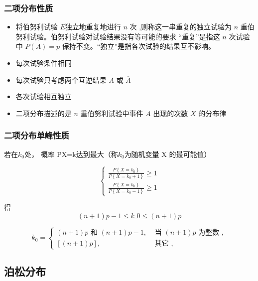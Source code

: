 \subsubsection{二项分布性质}

\begin{itemize}
    \item 将伯努利试验 $E$独立地重复地进行 $n$ 次 ,则称这一串重复的独立试验为 $n$ 重伯努利试验。伯努利试验对试验结果没有等可能的要求 “重复”是指这 $n$ 次试验中 $P(A)= p$ 保持不变。“独立”是指各次试验的结果互不影响。
    \item 每次试验条件相同
    \item 每次试验只考虑两个互逆结果 $A$ 或 $\overline{A}$
    \item 各次试验相互独立
    \item 二项分布描述的是 $n$ 重伯努利试验中事件 $A$ 出现的次数 $X$ 的分布律
\end{itemize}

\subsubsection{二项分布单峰性质}

若在$k_0$处， 概率 P{X=k}达到最大（称$k_0$为随机变量 X 的最可能值）

\begin{equation}
\left\{\begin{array}{l}
\frac{P\left\{X=k_{0}\right\}}{P\left\{X=k_{0}+1\right\}} \geq 1 \\
\frac{P\left\{X=k_{0}\right\}}{P\left\{X=k_{0}-1\right\}} \geq 1
\end{array}\right.
\end{equation}

得
\begin{equation} (n+1) p-1 \leq k\_{0} \leq(n+1) p \end{equation}

\begin{equation}
k_{0}=\left\{\begin{array}{ll}
(n+1) p \text { 和 }(n+1) p-1, & \text { 当 }({n}+{1}) {p} \text { 为整数 }, \\
{[(n+1) p],} & \text { 其它 },
\end{array}\right.
\end{equation}

\subsection{泊松分布}

